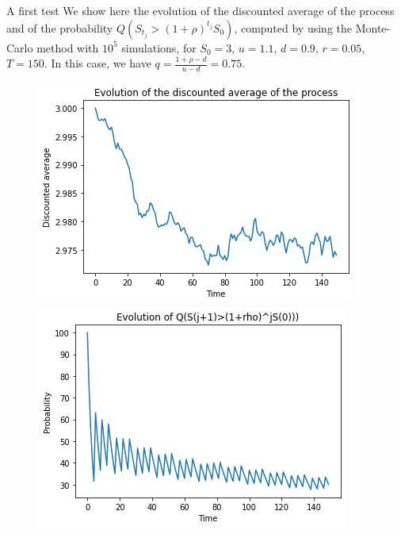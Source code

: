 \documentclass[9 pt]{beamer} %
\begin{document}
\begin{frame}{A first test}
We show here the evolution of the discounted average of the process and of the probability $Q(S_{t_j}>(1+\rho)^{t_j}S_0)$, computed by using the Monte-Carlo method with $10^5$ simulations, for $S_0=3$, $u=1.1$, $d=0.9$, $r=0.05$, $T=150$. In this case, we have $q=\frac{1+\rho-d}{u-d}=0.75$.
 \begin{figure}
\centering
\begin{minipage}[b]{.5\textwidth}
  \centering
 \includegraphics[scale=0.4]{Averaged09u11r005.png}
\end{minipage}%
\begin{minipage}[b]{.5\textwidth}
  \centering
 \includegraphics[scale=0.4]{Probabilityu11d09.png}
\end{minipage}
\end{figure}
\end{frame}
\end{document}
